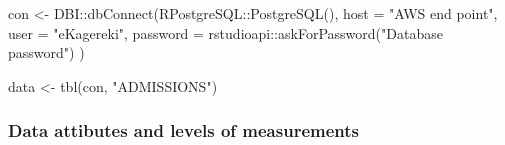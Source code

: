 \documentclass[
]{article}
\newenvironment{Shaded}{\begin{snugshade}}{\end{snugshade}}
\newcommand{\AttributeTok}[1]{\textcolor[rgb]{0.77,0.63,0.00}{#1}}
\newcommand{\FunctionTok}[1]{\textcolor[rgb]{0.00,0.00,0.00}{#1}}
\newcommand{\NormalTok}[1]{#1}
\newcommand{\OtherTok}[1]{\textcolor[rgb]{0.56,0.35,0.01}{#1}}
\newcommand{\SpecialCharTok}[1]{\textcolor[rgb]{0.00,0.00,0.00}{#1}}
\newcommand{\StringTok}[1]{\textcolor[rgb]{0.31,0.60,0.02}{#1}}
\begin{document}
\begin{Shaded}
\begin{Highlighting}[]
\NormalTok{con }\OtherTok{\textless{}{-}}\NormalTok{ DBI}\SpecialCharTok{::}\FunctionTok{dbConnect}\NormalTok{(RPostgreSQL}\SpecialCharTok{::}\FunctionTok{PostgreSQL}\NormalTok{(), }
  \AttributeTok{host =} \StringTok{"AWS end point"}\NormalTok{,}
  \AttributeTok{user =} \StringTok{"eKagereki"}\NormalTok{,}
  \AttributeTok{password =}\NormalTok{ rstudioapi}\SpecialCharTok{::}\FunctionTok{askForPassword}\NormalTok{(}\StringTok{"Database password"}\NormalTok{)}
\NormalTok{)}

\NormalTok{data }\OtherTok{\textless{}{-}} \FunctionTok{tbl}\NormalTok{(con, }\StringTok{"ADMISSIONS"}\NormalTok{)}
\end{Highlighting}
\end{Shaded}

\hypertarget{data-attibutes-and-levels-of-measurements}{%
\subsubsection{Data attibutes and levels of
measurements}\label{data-attibutes-and-levels-of-measurements}}
\end{document}
